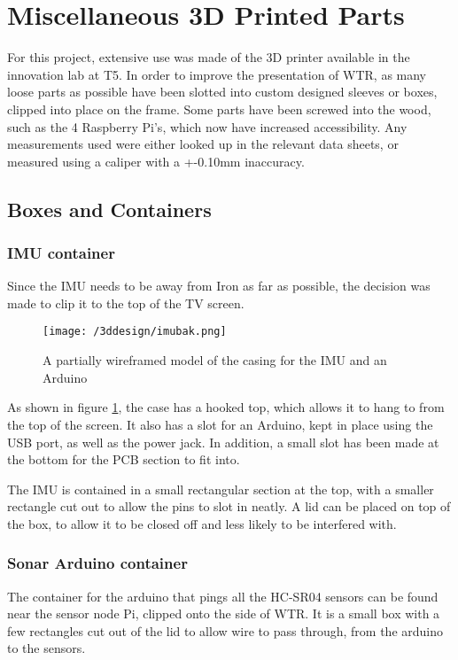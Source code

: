 \section{Miscellaneous 3D Printed Parts}
For this project, extensive use was made of the 3D printer available in the innovation lab at T5.
In order to improve the presentation of WTR, as many loose parts as possible have been slotted into custom designed sleeves or boxes, clipped into place on the frame.
Some parts have been screwed into the wood, such as the 4 Raspberry Pi's, which now have increased accessibility.
Any measurements used were either looked up in the relevant data sheets, or measured using a caliper with a +-0.10mm inaccuracy.

\subsection{Boxes and Containers}
\subsubsection{IMU container}
Since the IMU needs to be away from Iron as far as possible, the decision was made to clip it to the top of the TV screen.

\begin{figure}[H]
\centering
\texttt{[image: /3ddesign/imubak.png]}
\caption{A partially wireframed model of the casing for the IMU and an Arduino}
\label{fig::IMUB}
\end{figure}

As shown in figure \ref{fig::IMUB}, the case has a hooked top, which allows it to hang to from the top of the screen.
It also has a slot for an Arduino, kept in place using the USB port, as well as the power jack.
In addition, a small slot has been made at the bottom for the PCB section to fit into.

The IMU is contained in a small rectangular section at the top, with a smaller rectangle cut out to allow the pins to slot in neatly.
A lid can be placed on top of the box, to allow it to be closed off and less likely to be interfered with.

\subsubsection{Sonar Arduino container}
The container for the arduino that pings all the HC-SR04 sensors can be found near the sensor node Pi, clipped onto the side of WTR.
It is a small box with a few rectangles cut out of the lid to allow wire to pass through, from the arduino to the sensors.

